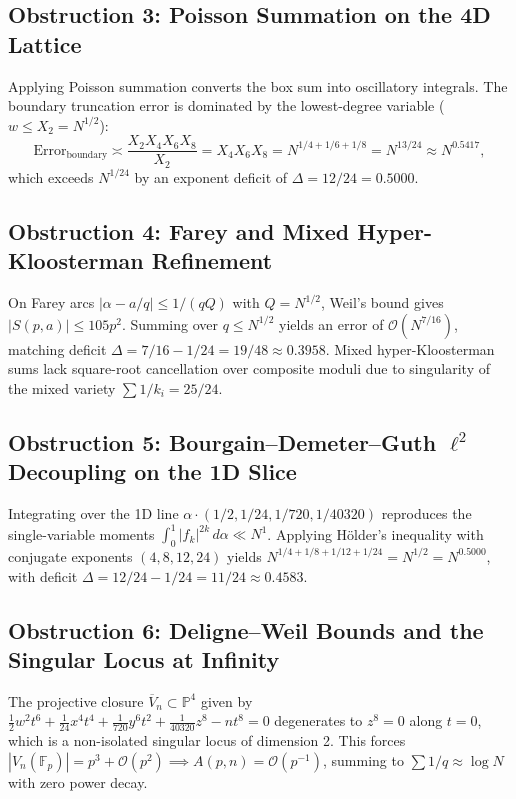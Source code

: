 \documentclass[11pt, a4paper]{article}
\theoremstyle{plain}
\theoremstyle{definition}
\begin{document}
\subsection{Obstruction 3: Poisson Summation on the 4D Lattice}
Applying Poisson summation converts the box sum into oscillatory integrals. The boundary truncation error is dominated by the lowest-degree variable ($w \leq X_2 = N^{1/2}$):
\[
\text{Error}_{\text{boundary}} \asymp \frac{X_2 X_4 X_6 X_8}{X_2} = X_4 X_6 X_8 = N^{1/4 + 1/6 + 1/8} = N^{13/24} \approx N^{0.5417},
\]
which exceeds $N^{1/24}$ by an exponent deficit of $\Delta = 12/24 = 0.5000$.

\subsection{Obstruction 4: Farey and Mixed Hyper-Kloosterman Refinement}
On Farey arcs $|\alpha - a/q| \leq 1/(qQ)$ with $Q = N^{1/2}$, Weil's bound gives $|S(p,a)| \leq 105 p^2$. Summing over $q \leq N^{1/2}$ yields an error of $\mathcal{O}(N^{7/16})$, matching deficit $\Delta = 7/16 - 1/24 = 19/48 \approx 0.3958$. Mixed hyper-Kloosterman sums lack square-root cancellation over composite moduli due to singularity of the mixed variety $\sum 1/k_i = 25/24$.

\subsection{Obstruction 5: Bourgain--Demeter--Guth $\ell^2$ Decoupling on the 1D Slice}
Integrating over the 1D line $\alpha \cdot (1/2, 1/24, 1/720, 1/40320)$ reproduces the single-variable moments $\int_0^1 |f_k|^{2k}\,d\alpha \ll N^1$. Applying H\"older's inequality with conjugate exponents $(4,8,12,24)$ yields $N^{1/4 + 1/8 + 1/12 + 1/24} = N^{1/2} = N^{0.5000}$, with deficit $\Delta = 12/24 - 1/24 = 11/24 \approx 0.4583$.

\subsection{Obstruction 6: Deligne--Weil Bounds and the Singular Locus at Infinity}
The projective closure $\overline{V}_n \subset \mathbb{P}^4$ given by $\frac12 w^2 t^6 + \frac{1}{24} x^4 t^4 + \frac{1}{720} y^6 t^2 + \frac{1}{40320} z^8 - n t^8 = 0$ degenerates to $z^8 = 0$ along $t = 0$, which is a non-isolated singular locus of dimension 2. This forces $|V_n(\mathbb{F}_p)| = p^3 + \mathcal{O}(p^2) \implies A(p,n) = \mathcal{O}(p^{-1})$, summing to $\sum 1/q \approx \log N$ with zero power decay.
\end{document}

